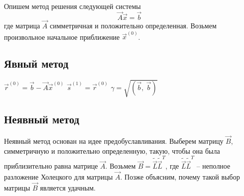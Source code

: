 Опишем метод решения следующей системы
\[ \vec{A}\vec{x} = \vec{b} \]
где матрица $\vec{A}$ симметричная и положительно определенная.
Возьмем произвольное начальное приближение $\vec{x}^{(0)}$.

\SetAlFnt{\normalsize}
\SetAlgoNoLine

\subsection{Явный метод}
\begin{algorithm*}[H]
    \DontPrintSemicolon

    $\vec{r}^{(0)} = \vec{b} - \vec{A} \vec{x}^{(0)}$\;
    $\vec{s}^{(1)} = \vec{r}^{(0)}$\;
    $\gamma = \sqrt{\left( \vec{b},\ \vec{b} \right)}$\;

\end{algorithm*}

\subsection{Неявный метод}
Неявный метод основан на идее предобуславливания. Выберем матрицу $\vec{B}$, симметричную и положительно определенную, такую, чтобы она была приблизительно равна матрице $\vec{A}$.
Возьмем $\vec{B} = \widetilde{\vec{L}} \widetilde{\vec{L}}^T$, где $\widetilde{\vec{L}} \widetilde{\vec{L}}^T$ -- неполное разложение
Холецкого для матрицы $\vec{A}$. Позже объясним, почему такой выбор матрицы $\vec{B}$ является удачным.


